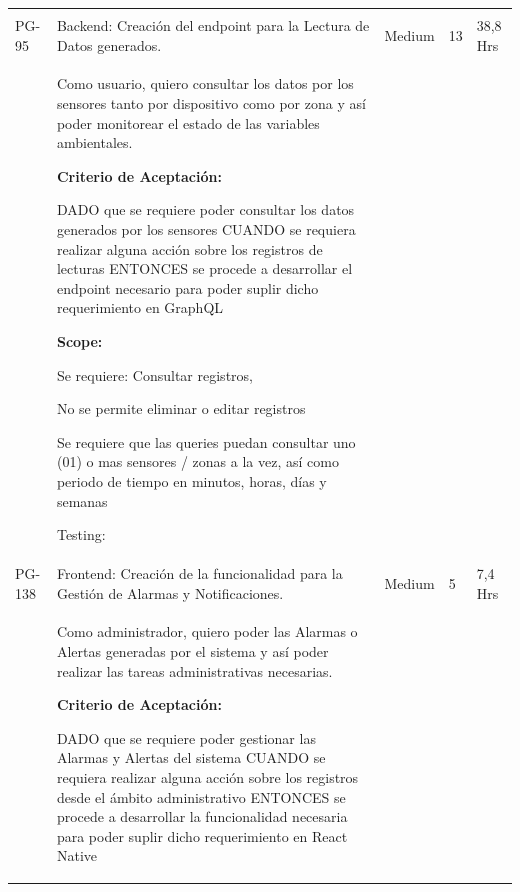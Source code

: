 \documentclass[11pt]{charter}
\begin{document}
\begin{landscape}
\begin{tabularx}{\linewidth}{@{}|p{1.3cm}|p{17cm}|p{1.7cm}|p{1.5cm}|p{1.7cm}|@{}}
\begin{description}
            \end{description}  &  &     & \\
PG-95    & Backend: Creación del endpoint   para la Lectura de Datos generados.                 & Medium             & 13  & 38,8  Hrs         \\
         &  \begin{description}                 
                   \item Como usuario, quiero consultar   los datos por los sensores tanto por dispositivo como por zona y así poder   monitorear el estado de las variables ambientales.                 
                   \item \textbf{Criterio de Aceptación:}                 
                   \item DADO que se requiere poder consultar los datos generados por los   sensores CUANDO se requiera realizar alguna acción sobre los registros de   lecturas ENTONCES se procede a desarrollar el endpoint necesario para poder suplir dicho requerimiento en GraphQL                
                   \item \textbf{Scope:}             
                         \item Se requiere: Consultar registros, 
                         \item No se permite eliminar o editar registros 
                         \item Se requiere que las queries puedan consultar uno (01) o mas sensores /   zonas a la vez, así como periodo de tiempo en minutos, horas, días y   semanas                 
                   \item Testing:
            \end{description}          &  &     & \\                     
PG-138   & Frontend: Creación de la   funcionalidad para la Gestión de Alarmas y Notificaciones.& Medium             & 5   & 7,4  Hrs          \\
         &  \begin{description}                 
                   \item Como administrador, quiero poder   las Alarmas o Alertas generadas por el sistema y así poder realizar las   tareas administrativas necesarias.                 
                   \item \textbf{Criterio de Aceptación:}                 
                   \item DADO que se requiere poder gestionar las Alarmas y Alertas del   sistema CUANDO se requiera realizar alguna acción sobre los registros desde el   ámbito administrativo ENTONCES se procede a desarrollar la funcionalidad necesaria para poder   suplir dicho requerimiento en React Native                

\end{description}
\end{tabularx}
\end{landscape}
\end{document}
